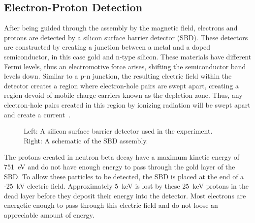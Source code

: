 \documentclass[oneside,12pt]{memoir}
\begin{document}
\subsection{Electron-Proton Detection}
\label{sec:sbd}
After being guided through the assembly by the magnetic field, electrons and protons are detected by a silicon surface barrier detector (SBD). These detectors are constructed by creating a junction between a metal and a doped semiconductor, in this case gold and n-type silicon. These materials have different Fermi levels, thus an electromotive force arises, shifting the semiconductor band levels down. Similar to a p-n junction, the resulting electric field within the detector creates a region where electron-hole pairs are swept apart, creating a region devoid of mobile charge carriers known as the depletion zone. Thus, any electron-hole pairs created in this region by ionizing radiation will be swept apart and create a current~\cite{leo87}.\par
\begin{figure}[t]
	\centering
	\caption[Silicon detector and schematic.]{Left: A silicon surface barrier detector used in the experiment. Right: A schematic of the SBD assembly.}
\end{figure}
The protons created in neutron beta decay have a maximum kinetic energy of 751~eV and do not have enough energy to pass through the gold layer of the SBD. To allow these particles to be detected, the SBD is placed at the end of a -25~kV electric field. Approximately 5~keV is lost by these 25~keV protons in the dead layer before they deposit their energy into the detector. Most electrons are energetic enough to pass through this electric field and do not loose an appreciable amount of energy.\par
\end{document}
